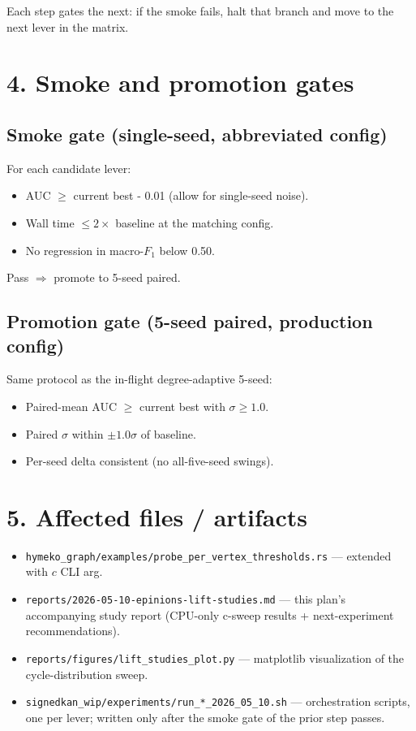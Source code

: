 \documentclass[a4paper,11pt]{article}
\begin{document}
Each step gates the next: if the smoke fails, halt that branch and
move to the next lever in the matrix.

\section*{4. Smoke and promotion gates}

\subsection*{Smoke gate (single-seed, abbreviated config)}

For each candidate lever:

\begin{itemize}
  \item AUC $\ge$ current best - 0.01 (allow for single-seed noise).
  \item Wall time $\le 2 \times$ baseline at the matching config.
  \item No regression in macro-$F_1$ below 0.50.
\end{itemize}

Pass $\Rightarrow$ promote to 5-seed paired.

\subsection*{Promotion gate (5-seed paired, production config)}

Same protocol as the in-flight degree-adaptive 5-seed:

\begin{itemize}
  \item Paired-mean AUC $\ge$ current best with $\sigma \ge 1.0$.
  \item Paired $\sigma$ within $\pm 1.0\sigma$ of baseline.
  \item Per-seed delta consistent (no all-five-seed swings).
\end{itemize}

\section*{5. Affected files / artifacts}

\begin{itemize}
  \item \texttt{hymeko\_graph/examples/probe\_per\_vertex\_thresholds.rs}
    — extended with $c$ CLI arg.
  \item \texttt{reports/2026-05-10-epinions-lift-studies.md} — this
    plan's accompanying study report (CPU-only c-sweep results +
    next-experiment recommendations).
  \item \texttt{reports/figures/lift\_studies\_plot.py} — matplotlib
    visualization of the cycle-distribution sweep.
  \item \texttt{signedkan\_wip/experiments/run\_*\_2026\_05\_10.sh}
    — orchestration scripts, one per lever; written only after the
    smoke gate of the prior step passes.
\end{itemize}
\end{document}
